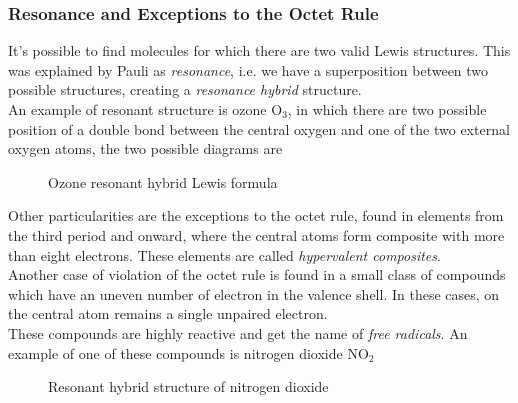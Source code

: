 \documentclass[../qm.tex]{subfiles}
\begin{document}
\subsubsection{Resonance and Exceptions to the Octet Rule}
It's possible to find molecules for which there are two valid Lewis structures. This was explained by Pauli as \textit{resonance}, i.e. we have a superposition between two possible structures, creating a \emph{resonance hybrid} structure.\\
An example of resonant structure is ozone $\mathrm{O_3}$, in which there are two possible position of a double bond between the central oxygen and one of the two external oxygen atoms, the two possible diagrams are
\begin{figure}[H]
	\centering
	\qquad{}
	\caption{Ozone resonant hybrid Lewis formula}
	\label{fig:ozone.chem}
\end{figure}
Other particularities are the exceptions to the octet rule, found in elements from the third period and onward, where the central atoms form composite with more than eight electrons. These elements are called \emph{hypervalent composites}.\\
Another case of violation of the octet rule is found in a small class of compounds which have an uneven number of electron in the valence shell. In these cases, on the central atom remains a single unpaired electron.\\
These compounds are highly reactive and get the name of \emph{free radicals}. An example of one of these compounds is nitrogen dioxide $\mathrm{NO_2}$
\begin{figure}[H]
	\centering
	\qquad{}
	\caption{Resonant hybrid structure of nitrogen dioxide}
	\label{fig:no2.chem}
\end{figure}
\end{document}
